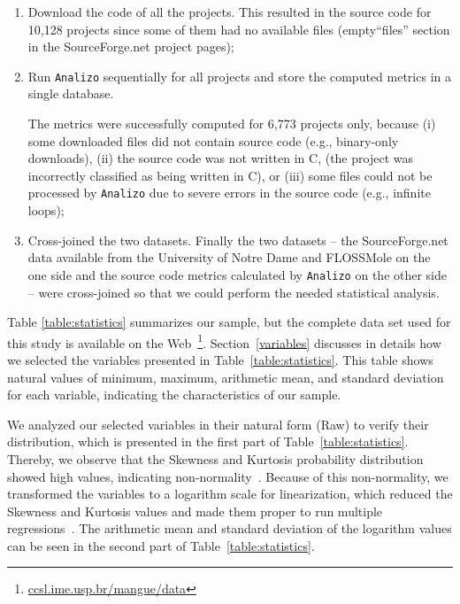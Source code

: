 \documentclass[conference]{IEEEtran}
\begin{document}
\begin{enumerate}
\item Download the code of all the projects. This resulted in the source code 
for 10,128 projects since some of them had no available files (empty``files''
section in the SourceForge.net project pages);

\item Run \texttt{Analizo} sequentially for all projects and store the computed metrics in a single database.
%

The metrics were successfully computed for 6,773 projects only, because
(i) some downloaded files did not contain source code (e.g., binary-only downloads),
%
(ii) the source code was not written in C, (the project was incorrectly 
classified as being written in C), or
%
(iii) some files could not be processed by \texttt{Analizo} due to severe
errors in the source code (e.g., infinite loops);

\item Cross-joined the two datasets. Finally the two datasets --
the SourceForge.net data available from the University of Notre Dame and 
FLOSSMole on the one side and the source code metrics calculated 
by \texttt{Analizo} on the other side --  were cross-joined so that
we could perform the needed statistical analysis. 
\end{enumerate}

Table \ref{table:statistics} summarizes our sample, but the complete data set
used for this study is available on the Web~\footnote{\url{ccsl.ime.usp.br/mangue/data}}.
%
Section~\ref{variables} discusses in details how we selected the variables
presented in Table~\ref{table:statistics}.
%
This table shows natural values of minimum, maximum, arithmetic mean, and 
standard deviation for each variable, indicating the characteristics of our sample.

We analyzed our selected variables in their natural form (Raw) to verify their
distribution, which is presented in the first part of Table~\ref{table:statistics}.
%
Thereby, we observe that the Skewness and Kurtosis probability distribution
showed high values, indicating non-normality~\cite{hair2006}.
%
Because of this non-normality, we transformed the variables to a logarithm 
scale for linearization, which reduced the Skewness and Kurtosis values and made
them proper to run multiple regressions~\cite{Crowston2002}.
%
The arithmetic mean and standard deviation of the logarithm values can be
seen in the second part of Table~\ref{table:statistics}.
\end{document}
